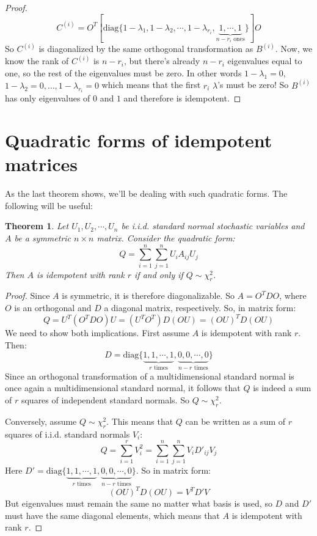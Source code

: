 \documentclass[12pt, a4paper]{article}
\newtheorem{theorem}{Theorem}
\begin{document}
\begin{proof}
\begin{equation}
C^{(i)}=O^T\left[\textrm{diag}\{1-\lambda_1,1-\lambda_2,\cdots,1-\lambda_{r_i},\underbrace{1,\cdots,1}_{n-r_i\textrm{ ones}}\}\right]O
\end{equation}
So $C^{(i)}$ is diagonalized by the same orthogonal transformation as $B^{(i)}$. Now, we know the rank of $C^{(i)}$ is $n-r_i$, but there's already $n-r_i$ eigenvalues equal to one, so the rest of the eigenvalues must be zero. In other words $1-\lambda_1=0$, $1-\lambda_2=0, \ldots, 1-\lambda_{r_i}=0$ which means that the first $r_i$ $\lambda$'s must be zero! So $B^{(i)}$ has only eigenvalues of $0$ and $1$ and therefore is idempotent.
\end{proof}

\section{Quadratic forms of idempotent matrices}
As the last theorem shows, we'll be dealing with such quadratic forms. The following will be useful:
\begin{theorem}
\label{quadform}
Let $U_1,U_2,\cdots, U_n$ be i.i.d. standard normal stochastic variables and $A$ be a symmetric $n\times n$ matrix. Consider the quadratic form:
\begin{equation}
Q=\sum_{i=1}^n\sum_{j=1}^n U_i A_{ij} U_j
\end{equation}
Then $A$ is idempotent with rank $r$ if and only if $Q\sim\chi^2_r$.
\end{theorem}
\begin{proof}
Since $A$ is symmetric, it is therefore diagonalizable. So $A=O^TDO$, where $O$ is an orthogonal and $D$ a diagonal matrix, respectively. So, in matrix form:
\begin{equation}
Q=U^T(O^TDO)U=(U^TO^T)D(OU)=(OU)^T D(OU)
\end{equation}
We need to show both implications. First assume $A$ is idempotent with rank $r$. Then:
\begin{equation}
D=\textrm{diag}\{\underbrace{1, 1, \cdots, 1}_{r\textrm{ times}},\underbrace{0, 0,\cdots, 0}_{n-r\textrm{ times}}\}
\end{equation}
Since an orthogonal transformation of a multidimensional standard normal is once again a multidimensional standard normal, it follows that $Q$ is indeed a sum of $r$ squares of independent standard normals. So $Q\sim\chi^2_r$.\par
Conversely, assume $Q\sim\chi^2_r$. This means that $Q$ can be written as a sum of $r$ squares of i.i.d. standard normals $V_i$:
\begin{equation}
Q=\sum_{i=1}^r V_i^2=\sum_{i=1}^n\sum_{j=1}^n V_i D'_{ij} V_j
\end{equation}
Here $D'=\textrm{diag}\{\underbrace{1, 1, \cdots, 1}_{r\textrm{ times}},\underbrace{0, 0,\cdots, 0}_{n-r\textrm{ times}}\}$. 
So in matrix form:
\begin{equation}
(OU)^T D(OU)=V^T D' V
\end{equation}
But eigenvalues must remain the same no matter what basis is used, so $D$ and $D'$ must have the same diagonal elements, which means that $A$ is idempotent with rank $r$.
\end{proof}
\end{document}
